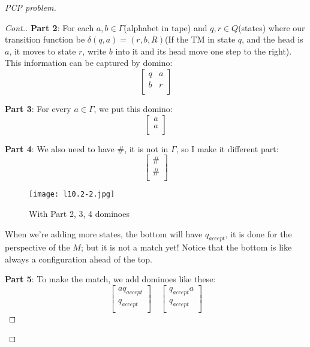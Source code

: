 \begin{proof}[PCP problem]
\begin{proof}[Cont.]
        \textbf{Part 2}: For each \(a, b \in \Gamma\)(alphabet in tape) and \(q, r \in Q\)(states) where our transition function be \(\delta(q, a) = (r, b, R)\)(If the TM in state \(q\), and the head is \(a\), it moves to state \(r\), write \(b\) into it and its head move one step to the right). 
        This information can be captured by domino:
        \[
            \begin{bmatrix}
                q & a  \\
                b & r  \\
            \end{bmatrix}
        \]

        \textbf{Part 3}: For every \(a \in \Gamma\), we put this domino:
        \[
            \begin{bmatrix}
                 a \\
                 a \\
            \end{bmatrix}
        \]  

        \textbf{Part 4}: We also need to have \(\#\), it is not in \(\Gamma\), so I make it different part:
        \[
            \begin{bmatrix}
                 \# \\
                 \# \\
            \end{bmatrix}
        \]
        \begin{figure}[H]
            \centering
            \texttt{[image: l10.2-2.jpg]}
            \caption{With Part 2, 3, 4 dominoes}
        \end{figure}

        When we're adding more states, the bottom will have \(q_{accept}\), it is done for the perspective of the \(M\); 
        but it is not a match yet! 
        Notice that the bottom is like always a configuration ahead of the top.

        \textbf{Part 5}: To make the match, we add dominoes like these:
        \[
            \begin{bmatrix}
                 a q_{accept} \\
                 q_{accept} \\
            \end{bmatrix}    
            \quad
            \begin{bmatrix}
                 q_{accept} a \\
                 q_{accept} \\
            \end{bmatrix}
        \]


\end{proof}
\end{proof}

